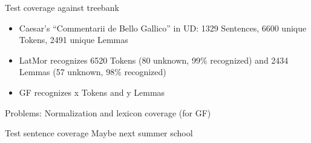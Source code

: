 \documentclass{beamer}
\begin{document}
\begin{frame}{Test coverage against treebank}
  \begin{itemize}
  \item Caesar's ``Commentarii de Bello Gallico'' in UD: 1329 Sentences, 6600 unique Tokens, 2491 unique Lemmas
  \item LatMor recognizes 6520 Tokens (80 unknown, 99\% recognized) and 2434 Lemmas (57 unknown, 98\% recognized)
  \item GF recognizes x Tokens and y Lemmas
  \end{itemize}
  Problems: Normalization and lexicon coverage (for GF)
\end{frame}
\begin{frame}{Test sentence coverage}
  Maybe next summer school
\end{frame}
\end{document}
